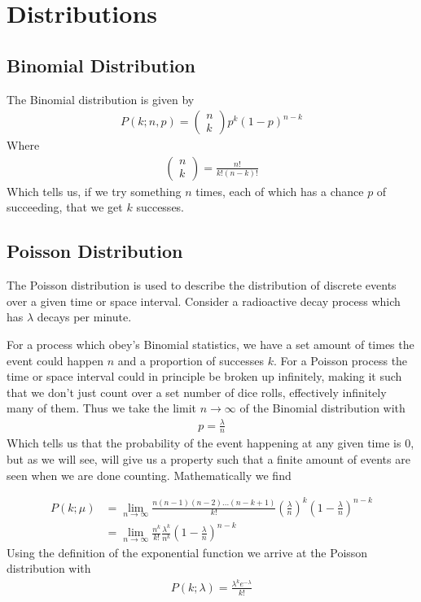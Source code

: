 \label{ch:statistics}

\section{Distributions}
\subsection{Binomial Distribution}
The Binomial distribution is given by
\begin{align}
P(k;n,p) = \begin{pmatrix}
n\\
k
\end{pmatrix}p^k(1-p)^{n-k}
\end{align}
Where 
\begin{align}
\begin{pmatrix}
n\\
k
\end{pmatrix} = \frac{n!}{k!(n-k)!}
\end{align}
Which tells us, if we try something $n$ times, each of which has a chance $p$ of succeeding, that we get $k$ successes. 

\subsection{Poisson Distribution}
The Poisson distribution is used to describe the distribution of discrete events over a given time or space interval. Consider a radioactive decay process which has $\lambda$ decays per minute. 

For a process which obey's Binomial statistics, we have a set amount of times the event could happen $n$ and a proportion of successes $k$. For a Poisson process the time or space interval could in principle be broken up infinitely, making it such that we don't just count over a set number of dice rolls, effectively infinitely many of them. Thus we take the limit $n\rightarrow \infty$ of the Binomial distribution with
\begin{align}
p = \frac{\lambda}{n}
\end{align}
Which tells us that the probability of the event happening at any given time is $0$, but as we will see, will give us a property such that a finite amount of events are seen when we are done counting. Mathematically we find

\begin{align}
P(k; \mu) &= \lim_{n\to \infty} \frac{n(n-1)(n-2)...(n-k+1)}{k!}\left(\frac{\lambda}{n}\right)^k\left(1-\frac{\lambda}{n}\right)^{n-k}\\
&= \lim_{n\to \infty}\frac{n^k}{k!}\frac{\lambda^k}{n^k}\left(1-\frac{\lambda}{n}\right)^{n-k}
\end{align}
Using the definition of the exponential function we arrive at the Poisson distribution with
\begin{align}
P(k; \lambda) = \frac{\lambda^ke^{-\lambda}}{k!}
\end{align}

